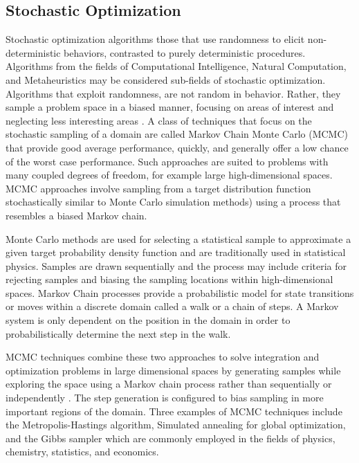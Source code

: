\documentclass[a4paper, 11pt]{article}
\begin{document}
\subsection{Stochastic Optimization}
\label{subsec:stochastic}
Stochastic optimization algorithms those that use randomness to elicit non-deterministic behaviors, contrasted to purely deterministic procedures. Algorithms from the fields of Computational Intelligence, Natural Computation, and Metaheuristics may be considered sub-fields of stochastic optimization. Algorithms that exploit randomness, are not random in behavior. Rather, they sample a problem space in a biased manner, focusing on areas of interest and neglecting less interesting areas \cite{Spall2003}. 
A class of techniques that focus on the stochastic sampling of a domain are called Markov Chain Monte Carlo (MCMC) that provide good average performance, quickly, and generally offer a low chance of the worst case performance. Such approaches are suited to problems with many coupled degrees of freedom, for example large high-dimensional spaces. MCMC approaches involve sampling from a target distribution function stochastically similar to Monte Carlo simulation methods) using a process that resembles a biased Markov chain.

Monte Carlo methods are used for selecting a statistical sample to approximate a given target probability density function and are traditionally used in statistical physics. Samples are drawn sequentially and the process may include criteria for rejecting samples and biasing the sampling locations within high-dimensional spaces. 
Markov Chain processes provide a probabilistic model for state transitions or moves within a discrete domain called a walk or a chain of steps. A Markov system is only dependent on the position in the domain in order to probabilistically determine the next step in the walk. 

MCMC techniques combine these two approaches to solve integration and optimization problems in large dimensional spaces by generating samples while exploring the space using a Markov chain process rather than sequentially or independently \cite{Andrieu2003}. The step generation is configured to bias sampling in more important regions of the domain. Three examples of MCMC techniques include the Metropolis-Hastings algorithm, Simulated annealing for global optimization, and the Gibbs sampler which are commonly employed in the fields of physics, chemistry, statistics, and economics. 
\end{document}
